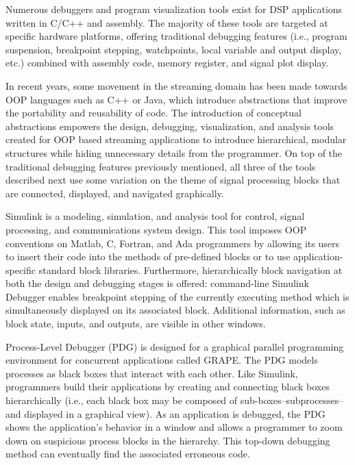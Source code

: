 \documentclass[11pt, letterpaper, onecolumn]{article}
\begin{document}
Numerous  debuggers  and program  visualization  tools  exist for  DSP
applications  written in C/C++  and assembly.   The majority  of these
tools   are  targeted   at  specific   hardware   platforms,  offering
traditional debugging  features (i.e., program  suspension, breakpoint
stepping,  watchpoints,  local  variable  and  output  display,  etc.)
combined with assembly code, memory register, and signal plot display.

In recent years,  some movement in the streaming  domain has been made
towards  OOP   languages  such  as   C++  or  Java,   which  introduce
abstractions   that  improve  the   portability  and   reusability  of
code. The  introduction of conceptual  abstractions empowers
the design,  debugging, visualization, and analysis  tools created for
OOP  based streaming applications  to introduce  hierarchical, modular
structures while  hiding unnecessary  details from the  programmer. On
top of  the traditional  debugging features previously  mentioned, all
three of the  tools described next use some variation  on the theme of
signal processing blocks that  are connected, displayed, and navigated
graphically.

Simulink  is a  modeling, simulation,  and analysis  tool for
control,  signal processing,  and communications  system  design. This
tool  imposes   OOP  conventions  on  Matlab,  C,   Fortran,  and  Ada
programmers  by allowing  its  users  to insert  their  code into  the
methods of pre-defined blocks  or to use application-specific standard
block libraries. Furthermore,  hierarchically block navigation at both
the  design and  debugging  stages is  offered: command-line  Simulink
Debugger enables breakpoint stepping of the currently executing method
which is simultaneously displayed on its associated block.  Additional
information, such as block state,  inputs, and outputs, are visible in
other windows.

Process-Level  Debugger  (PDG) is  designed  for a  graphical
parallel  programming environment  for concurrent  applications called
GRAPE. The PDG models processes as black boxes that interact with each
other. Like Simulink, programmers build their applications by creating
and connecting black boxes hierarchically (i.e., each black box may be
composed  of  sub-boxes--subprocesses--and  displayed in  a  graphical
view). As an application is  debugged, the PDG shows the application's
behavior  in  a  window  and  allows  a programmer  to  zoom  down  on
suspicious process  blocks in the hierarchy.   This top-down debugging
method can eventually find the associated erroneous code.
\end{document}
